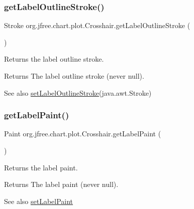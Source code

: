\subsubsection{\texorpdfstring{get\+Label\+Outline\+Stroke()}{getLabelOutlineStroke()}}
{\footnotesize\ttfamily Stroke org.\+jfree.\+chart.\+plot.\+Crosshair.\+get\+Label\+Outline\+Stroke (\begin{DoxyParamCaption}{ }\end{DoxyParamCaption})}

Returns the label outline stroke.

\begin{DoxyReturn}{Returns}
The label outline stroke (never {\ttfamily null}).
\end{DoxyReturn}
\begin{DoxySeeAlso}{See also}
\mbox{\hyperlink{classorg_1_1jfree_1_1chart_1_1plot_1_1_crosshair_a27fd7cb8534fb687f4f6209ec8fb1481}{set\+Label\+Outline\+Stroke}}(java.\+awt.\+Stroke) 
\end{DoxySeeAlso}
\mbox{\label{classorg_1_1jfree_1_1chart_1_1plot_1_1_crosshair_a45139a89c17fbaf039ed7df2d5441f17}} 
\subsubsection{\texorpdfstring{get\+Label\+Paint()}{getLabelPaint()}}
{\footnotesize\ttfamily Paint org.\+jfree.\+chart.\+plot.\+Crosshair.\+get\+Label\+Paint (\begin{DoxyParamCaption}{ }\end{DoxyParamCaption})}

Returns the label paint.

\begin{DoxyReturn}{Returns}
The label paint (never {\ttfamily null}).
\end{DoxyReturn}
\begin{DoxySeeAlso}{See also}
\mbox{\hyperlink{classorg_1_1jfree_1_1chart_1_1plot_1_1_crosshair_ac77cfc040e23230a364d863fa3512ef1}{set\+Label\+Paint}} 
\end{DoxySeeAlso}
\mbox{\label{classorg_1_1jfree_1_1chart_1_1plot_1_1_crosshair_a3702761bf1f6394f61e44f3763d3e63a}} 
